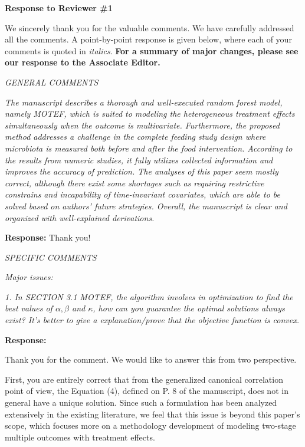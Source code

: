 \documentclass[11pt]{article}
\begin{document}
\medskip

\newpage
{\bf Response to Reviewer \#1}

We sincerely thank you for the valuable comments. We have carefully addressed all the comments. A point-by-point response is given below, where each of your comments is quoted in {\em italics}. \textbf{For a summary of major changes, please see our response to the Associate Editor. }

\bigskip

{\em GENERAL COMMENTS}

\medskip

{\em The manuscript describes a thorough and well-executed random forest model, namely MOTEF, which is suited to modeling the heterogeneous treatment effects simultaneously when the outcome is multivariate. Furthermore, the proposed method addresses a challenge in the complete feeding study design where microbiota is measured both before and after the food intervention. According to the results from numeric studies, it fully utilizes collected information and improves the accuracy of prediction. The analyses of this paper seem mostly correct, although there exist some shortages such as requiring restrictive constrains and incapability of time-invariant covariates, which are able to be solved based on authors' future strategies. Overall, the manuscript is clear and organized with well-explained derivations.}

\medskip

\textbf{Response:} Thank you!

\bigskip

{\em SPECIFIC COMMENTS}

\medskip

{\em Major issues:}

\medskip

{\em 1. In SECTION 3.1 MOTEF, the algorithm involves in optimization to find the best values of $\alpha, \beta$ and $\kappa$, how can you guarantee the optimal solutions always exist? It's better to give a explanation/prove that the objective function is convex.}

\medskip

\textbf{Response:} 

Thank you for the comment. We would like to answer this from two perspective.

First, you are entirely correct that from the generalized canonical correlation point of view, the Equation (4), defined on P. 8 of the manuscript, does not in general have a unique solution. Since such a formulation has been analyzed extensively in the existing literature, we feel that this issue is beyond this paper's scope, which focuses more on a methodology development of modeling two-stage multiple outcomes with treatment effects. 
\end{document}
